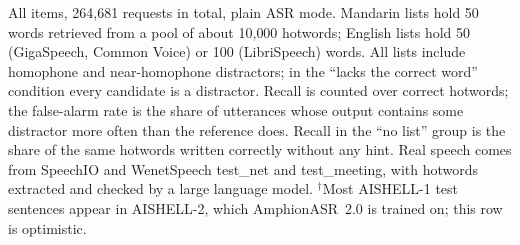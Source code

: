 \begin{table}[!tbp]
  {\footnotesize All items, 264{,}681 requests in total, plain ASR mode. Mandarin lists hold 50 words retrieved from a pool of about 10{,}000 hotwords; English lists hold 50 (GigaSpeech, Common Voice) or 100 (LibriSpeech) words. All lists include homophone and near-homophone distractors; in the ``lacks the correct word'' condition every candidate is a distractor. Recall is counted over correct hotwords; the false-alarm rate is the share of utterances whose output contains some distractor more often than the reference does. Recall in the ``no list'' group is the share of the same hotwords written correctly without any hint. Real speech comes from SpeechIO and WenetSpeech test\_net and test\_meeting, with hotwords extracted and checked by a large language model. $^\dagger$Most AISHELL-1 test sentences appear in AISHELL-2, which AmphionASR~2.0 is trained on; this row is optimistic.\par}
\end{table}

